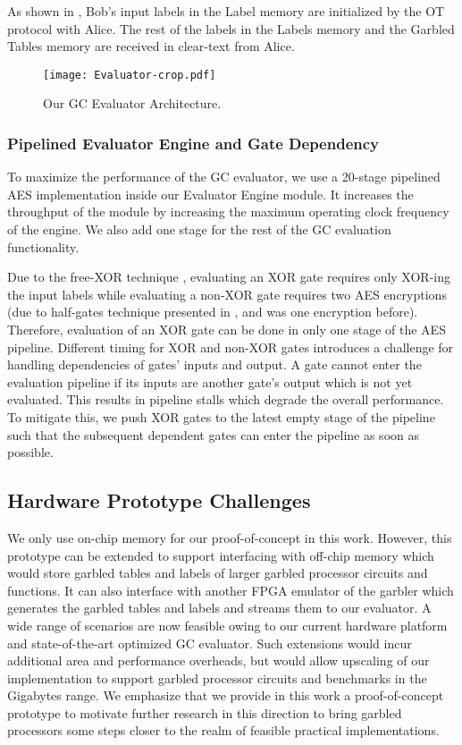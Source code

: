 As shown in , Bob's input labels in the Label memory are initialized by the OT protocol with Alice.
The rest of the labels in the Labels memory and the Garbled Tables memory are received in clear-text from Alice.

\begin{figure}
\centering
\texttt{[image: Evaluator-crop.pdf]}
\caption{Our GC Evaluator Architecture.}
\label{fig:evaluator}
\end{figure}

\subsubsection{Pipelined Evaluator Engine and Gate Dependency}\label{ssec:processor-hardware-pipeline}
To maximize the performance of the GC evaluator, we use a 20-stage pipelined AES implementation \cite{hsing2013tiny} inside our Evaluator Engine module. It increases the throughput of the module by increasing the maximum operating clock frequency of the engine. We also add one stage for the rest of the GC evaluation functionality.

Due to the free-XOR technique \cite{kolesnikov2008improved}, evaluating an XOR gate requires only XOR-ing the input labels while evaluating a non-XOR gate requires two AES encryptions (due to half-gates technique presented in , and was one encryption before). Therefore, evaluation of an XOR gate can be done in only one stage of the AES pipeline. Different timing for XOR and non-XOR gates introduces a challenge for handling dependencies of gates' inputs and output. A gate cannot enter the evaluation pipeline if its inputs are another gate's output which is not yet evaluated. This results in pipeline stalls which degrade the overall performance. To mitigate this, we push XOR gates to the latest empty stage of the pipeline such that the subsequent dependent gates can enter the pipeline as soon as possible.

\subsection{Hardware Prototype Challenges}\label{ssect:challenges}
We only use on-chip memory for our proof-of-concept in this work. However, this prototype can be extended to support interfacing with off-chip memory which would store garbled tables and labels of larger garbled processor circuits and functions. It can also interface with another FPGA emulator of the garbler which generates the garbled tables and labels and streams them to our evaluator. A wide range of scenarios are now feasible owing to our current hardware platform and state-of-the-art optimized GC evaluator.
%
Such extensions would incur additional area and performance overheads, but would allow upscaling of our implementation to support garbled processor circuits and benchmarks in the Gigabytes range. We emphasize that we provide in this work a proof-of-concept prototype to motivate further research in this direction to bring garbled processors some steps closer to the realm of feasible practical implementations.

